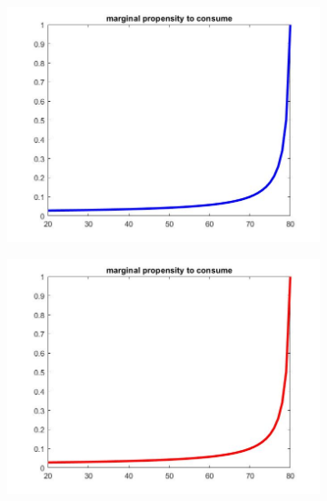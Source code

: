 \documentclass[12pt,a4paper]{article}
\begin{document}
\begin{figure}[h!]
  \centering
  \begin{subfigure}[b]{0.32\linewidth}
    \includegraphics[width=\linewidth]{graphs/Q2/mpc.jpg}
  \end{subfigure}
  \begin{subfigure}[b]{0.32\linewidth}
      \includegraphics[width=\linewidth]{graphs/Q2/mpc2.jpg}
  \end{subfigure}
  \begin{subfigure}[b]{0.32\linewidth}

\end{subfigure}
\end{figure}
\end{document}
